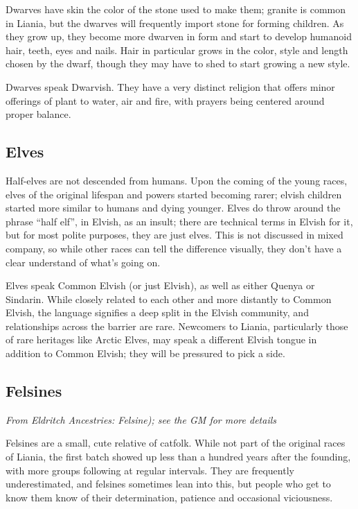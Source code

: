\documentclass{report}
\begin{document}
Dwarves have skin the color of the stone used to make them; granite is common
in Liania, but the dwarves will frequently import stone for forming children.
As they grow up, they become more dwarven in form and start to develop humanoid
hair, teeth, eyes and nails. Hair in particular grows in the color, style and
length chosen by the dwarf, though they may have to shed to start growing a new
style.

Dwarves speak Dwarvish. They have a very distinct religion that offers minor
offerings of plant to water, air and fire, with prayers being centered around
proper balance.

\subsection{Elves}

Half-elves are not descended from humans. Upon the coming of the young races,
elves of the original lifespan and powers started becoming rarer; elvish
children started more similar to humans and dying younger. Elves do throw around
the phrase ``half elf'', in Elvish, as an insult; there are technical terms in Elvish for it,
but for most polite purposes, they are just elves. This is not
discussed in mixed company, so while other races can tell the difference
visually, they don't have a clear understand of what's going on.

Elves speak Common Elvish (or just Elvish), as well as either Quenya or Sindarin.
While closely related to each other and more distantly to Common Elvish, the
language signifies a deep split in the Elvish community, and relationships
across the barrier are rare. Newcomers to Liania, particularly those of rare
heritages like Arctic Elves, may speak a different Elvish
tongue in addition to Common Elvish; they will be pressured to pick a side.

\subsection{Felsines}

\emph{From \emph{Eldritch Ancestries: Felsine}); see the GM for more details}

Felsines are a small, cute relative of catfolk. While not part of the original
races of Liania, the first batch showed up less than a hundred years after the
founding, with more groups following at regular intervals. They are frequently
underestimated, and felsines sometimes lean into this, but people who get to
know them know of their determination, patience and occasional viciousness.
\end{document}
